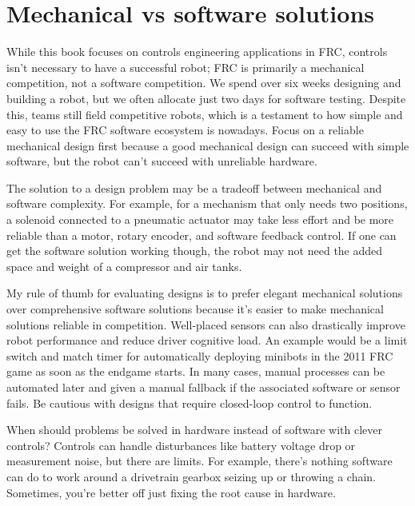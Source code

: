 \section{Mechanical vs software solutions}

While this book focuses on controls engineering applications in FRC, controls
isn't necessary to have a successful robot; FRC is primarily a mechanical
competition, not a software competition. We spend over six weeks designing and
building a robot, but we often allocate just two days for software testing.
Despite this, teams still field competitive robots, which is a testament to how
simple and easy to use the FRC software ecosystem is nowadays. Focus on a
reliable mechanical design first because a good mechanical design can succeed
with simple software, but the robot can't succeed with unreliable hardware.

The solution to a design problem may be a tradeoff between mechanical and
software complexity. For example, for a mechanism that only needs two positions,
a solenoid connected to a pneumatic actuator may take less effort and be more
reliable than a motor, rotary encoder, and software feedback control. If one can
get the software solution working though, the robot may not need the added space
and weight of a compressor and air tanks.

My rule of thumb for evaluating designs is to prefer elegant mechanical
solutions over comprehensive software solutions because it's easier to make
mechanical solutions reliable in competition. Well-placed sensors can also
drastically improve robot performance and reduce driver cognitive load. An
example would be a limit switch and match timer for automatically deploying
minibots in the 2011 FRC game as soon as the endgame starts. In many cases,
manual processes can be automated later and given a manual fallback if the
associated software or sensor fails. Be cautious with designs that require
closed-loop control to function.

When should problems be solved in hardware instead of software with clever
controls? Controls can handle disturbances like battery voltage drop or
measurement noise, but there are limits. For example, there's nothing software
can do to work around a drivetrain gearbox seizing up or throwing a chain.
Sometimes, you're better off just fixing the root cause in hardware.

